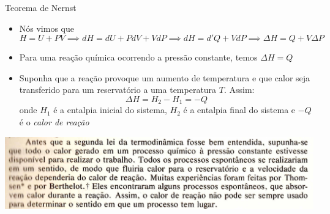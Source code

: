 \documentclass[t,%
brazilian,%
11pt,%
aspectratio=169,%
table%
]{beamer}
\begin{document}

\begin{frame}{Teorema de Nernst }
    \begin{itemize}
        \item Nós vimos que
            \[
                H=U+PV \implies dH = dU + PdV + VdP \implies dH = d'Q+VdP \implies \Delta H = Q + V\Delta P
            \]
        \item Para uma reação química ocorrendo a pressão constante, temos \(\Delta H=Q\)
        \item Suponha que a reação provoque um aumento de temperatura e que calor seja transferido para um reservatório
            a uma temperatura \(T\). Assim:
            \[
                \Delta H = H_2 - H_1 = -Q
            \]
            onde \(H_1\) é a entalpia inicial do sistema, \(H_2\) é a entalpia final do sistema e \(-Q\) é o 
            \textit{calor de reação}
    \end{itemize}
    \centering
    \includegraphics[width=\textwidth-75pt]{images/Captura de tela de 2023-05-24 12-05-18.png}
\end{frame}

\newcommand*{\hamsic}{%
  \begingroup
    \settoheight{\dimen0 }{H}%
    \resizebox{!}{\dimen0 }{%
      \tikz\fill svg[yscale=-1]{%
        M67,80l13,19L130,65L108,52z%
        M54,103A60,60 0 1,0 55,23A50,50 0 1,1 55,101z%
        m0,0L14,160l19,10L64,110z%
        M95,87l46,79l17,-12L108,79z%
      };%
    }%
  \endgroup
}
\end{document}
